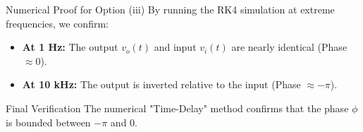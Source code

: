 \documentclass{beamer}
\begin{document}
\begin{frame}{Numerical Proof for Option (iii)}
    By running the RK4 simulation at extreme frequencies, we confirm:
    \par\vspace{0.4cm}
    \begin{itemize}
        \item \textbf{At 1 Hz:} The output $v_o(t)$ and input $v_i(t)$ are nearly identical (Phase $\approx 0$).
        \item \textbf{At 10 kHz:} The output is inverted relative to the input (Phase $\approx -\pi$).
    \end{itemize}
    \par\vspace{0.4cm}
    \begin{block}{Final Verification}
        The numerical "Time-Delay" method confirms that the phase $\phi$ is bounded between $-\pi$ and $0$.
    \end{block}
\end{frame}
\end{document}
